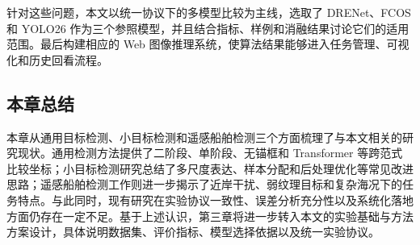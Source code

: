 针对这些问题，本文以统一协议下的多模型比较为主线，选取了 DRENet、FCOS 和 YOLO26 作为三个参照模型，并且结合指标、样例和消融结果讨论它们的适用范围。最后构建相应的 Web 图像推理系统，使算法结果能够进入任务管理、可视化和历史回看流程。

\subsection{本章总结}

本章从通用目标检测、小目标检测和遥感船舶检测三个方面梳理了与本文相关的研究现状。通用检测方法提供了二阶段、单阶段、无锚框和 Transformer 等跨范式比较坐标；小目标检测研究总结了多尺度表达、样本分配和后处理优化等常见改进思路；遥感船舶检测工作则进一步揭示了近岸干扰、弱纹理目标和复杂海况下的任务特点。与此同时，现有研究在实验协议一致性、误差分析充分性以及系统化落地方面仍存在一定不足。基于上述认识，第三章将进一步转入本文的实验基础与方法方案设计，具体说明数据集、评价指标、模型选择依据以及统一实验协议。
